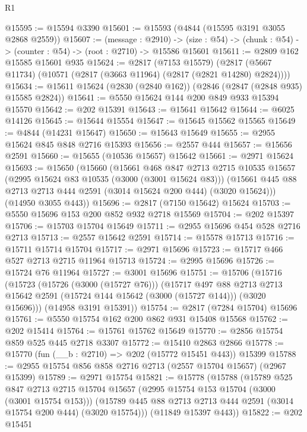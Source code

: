 \begin{lexlean}{R1}
\begin{coremodule}
@15595 := @15594 @3390
@15601 := @15593 (@4844 (@15595 @3191 @3055 @2868 @2559))
@15607 := (message : @2910) ->
  (size : @54) -> (chunk : @54) -> (counter : @54) -> (root : @2710) -> @15586 @15601
@15611 := @2809 @162 @15585 @15601 @935
@15624 := @2817
    (@7153 @15579)
    (@2817 (@5667 @11734) (@10571 (@2817 (@3663 @11964) (@2817 (@2821 @14280) @2824))))
@15634 := @15611 @15624 (@2830 (@2840 @162)) (@2846 (@2847 (@2848 @935) @15585 @2824))
@15641 := @5550 @15624 @144 @200 @849 @933 @15394 @15570
@15642 := @202 @15391
@15643 := @15641 @15642
@15644 := @6025 @14126
@15645 := @15644 @15554
@15647 := @15645 @15562 @15565
@15649 := @4844 (@14231 @15647)
@15650 := @15643 @15649
@15655 := @2955 @15624 @845 @848 @2716 @15393
@15656 := @2557 @444
@15657 := @15656 @2591
@15660 := @15655 (@10536 @15657) @15642
@15661 := @2971 @15624
@15693 := @15650
    (@15660
      (@15661
        @468
        @847
        @2713
        @2715
        @10535
        @15657
        (@2995 @15624 @83 @10535 (@3000 (@3001 @15624 @83)))
        (@15661 @445 @88 @2713 @2713 @444 @2591 (@3014 @15624 @200 @444) (@3020 @15624)))
      (@14950 @3055 @443))
@15696 := @2817 (@7150 @15642) @15624
@15703 := @5550 @15696 @153 @200 @852 @932 @2718 @15569
@15704 := @202 @15397
@15706 := @15703 @15704 @15649
@15711 := @2955 @15696 @454 @528 @2716 @2713
@15713 := @2557 @15642 @2591
@15714 := @15578 @15713
@15716 := @15711 @15714 @15704
@15717 := @2971 @15696
@15723 := @15717 @466 @527 @2713 @2715 @11964 @15713
@15724 := @2995 @15696
@15726 := @15724 @76 @11964
@15727 := @3001 @15696
@15751 := @15706
    (@15716
      (@15723
        (@15726 (@3000 (@15727 @76)))
        (@15717
          @497
          @88
          @2713
          @2713
          @15642
          @2591
          (@15724 @144 @15642 (@3000 (@15727 @144)))
          (@3020 @15696)))
      (@14958 @3191 @15391))
@15754 := @2817 (@7284 @15704) @15696
@15761 := @5550 @15754 @162 @200 @862 @931 @15408 @15568
@15762 := @202 @15414
@15764 := @15761 @15762 @15649
@15770 := @2856 @15754 @859 @525 @445 @2718 @3307
@15772 := @15410 @2863 @2866
@15778 := @15770 (fun (__b : @2710) => @202 (@15772 @15451 @443)) @15399
@15788 := @2955 @15754 @856 @858 @2716 @2713 (@2557 @15704 @15657) (@2967 @15399)
@15789 := @2971 @15754
@15821 := @15778
    (@15788
      (@15789
        @525
        @847
        @2713
        @2715
        @15704
        @15657
        (@2995 @15754 @153 @15704 (@3000 (@3001 @15754 @153)))
        (@15789 @445 @88 @2713 @2713 @444 @2591 (@3014 @15754 @200 @444) (@3020 @15754)))
      (@11849 @15397 @443))
@15822 := @202 @15451

\end{coremodule}
\end{lexlean}
